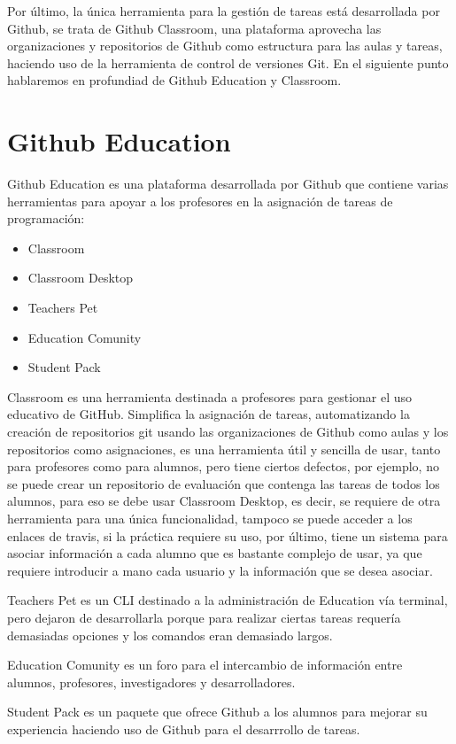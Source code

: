 Por último, la única herramienta para la gestión de tareas está desarrollada por Github, se trata de Github Classroom, una plataforma aprovecha las organizaciones y repositorios de Github como estructura para las aulas y tareas, haciendo uso de la herramienta de control de versiones Git. En el siguiente punto hablaremos en profundiad de Github Education y Classroom.


\section{Github Education}
\label{1:sec:2}

Github Education \cite{B12} es una plataforma desarrollada por Github que contiene varias herramientas para apoyar a los profesores en la asignación de tareas de programación:

\begin{itemize}
  \item Classroom
  \item Classroom Desktop
  \item Teachers Pet  
  \item Education Comunity
  \item Student Pack
\end{itemize}

Classroom es una herramienta destinada a profesores para gestionar el uso educativo de GitHub. Simplifica la asignación de tareas, automatizando la creación de repositorios git usando las organizaciones de Github como aulas y los repositorios como asignaciones, es una herramienta útil y sencilla de usar, tanto para profesores como para alumnos, pero tiene ciertos defectos, por ejemplo, no se puede crear un repositorio de evaluación que contenga las tareas de todos los alumnos, para eso se debe usar Classroom Desktop, es decir, se requiere de otra herramienta para una única funcionalidad, tampoco se puede acceder a los enlaces de travis, si la práctica requiere su uso, por último, tiene un sistema para asociar información a cada alumno que es bastante complejo de usar, ya que requiere introducir a mano cada usuario y la información que se desea asociar.

Teachers Pet es un CLI destinado a la administración de Education vía terminal, pero dejaron de desarrollarla porque para realizar ciertas tareas requería demasiadas opciones y los comandos eran demasiado largos.

Education Comunity es un foro para el intercambio de información entre alumnos, profesores, investigadores y desarrolladores.

Student Pack es un paquete que ofrece Github a los alumnos para mejorar su experiencia haciendo uso de Github para el desarrrollo de tareas.
